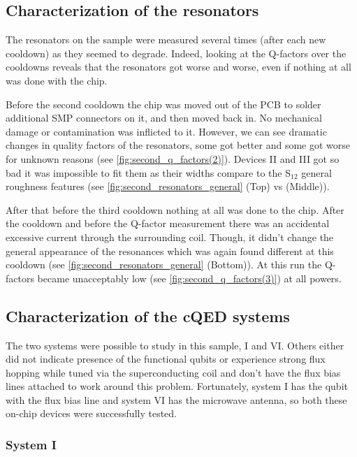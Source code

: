 \documentclass[12pt, twoside]{report}
\numberwithin{equation}{section}
\begin{document}
\subsection{Characterization of the resonators}

The resonators on the sample were measured several times (after each new cooldown) as they seemed to degrade. Indeed, looking at the Q-factors over the cooldowns reveals that the resonators got worse and worse, even if nothing at all was done with the chip.

Before the second cooldown the chip was moved out of the PCB to solder additional SMP connectors on it, and then moved back in. No mechanical damage or contamination was inflicted to it. However, we can see dramatic changes in quality factors of the resonators, some got better and some got worse for unknown reasons (see \autoref{fig:second_q_factors(2)}). Devices II and III got so bad it was impossible to fit them as their widths compare to the S$_{12}$ general roughness features (see \autoref{fig:second_resonators_general} (Top) vs (Middle)).

After that before the third cooldown nothing at all was done to the chip. After the cooldown and before the Q-factor measurement there was an accidental excessive current through the surrounding coil. Though, it didn't change the general appearance of the resonances which was again found different at this cooldown (see \autoref{fig:second_resonators_general} (Bottom)). At this run the Q-factors became unacceptably low (see \autoref{fig:second_q_factors(3)}) at all powers. 


\subsection{Characterization of the cQED systems}

The two systems were possible to study in this sample, I and VI. Others either did not indicate presence of the functional qubits or experience strong flux hopping while tuned via the superconducting coil and don't have the flux bias lines attached to work around this problem. Fortunately, system I has the qubit with the flux bias line and system VI has the microwave antenna, so both these on-chip devices were successfully tested.



\subsubsection{System I}
\end{document}

